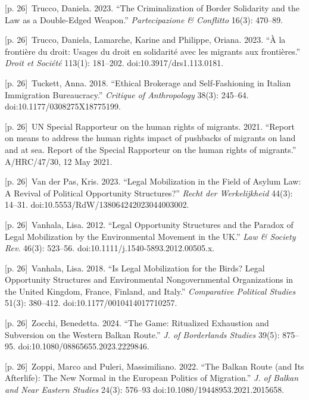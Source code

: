\documentclass[10pt,a4paper]{article}
\begin{document}
{\scriptsize\color{gray} [p. 26]}\ Trucco, Daniela. 2023. “The Criminalization of Border Solidarity and the Law as a Double-Edged Weapon.” \textit{Partecipazione \& Conflitto} 16(3): 470–89.\par
{\scriptsize\color{gray} [p. 26]}\ Trucco, Daniela, Lamarche, Karine and Philippe, Oriana. 2023. “À la frontière du droit: Usages du droit en solidarité avec les migrants aux frontières.” \textit{Droit et Société} 113(1): 181–202. doi:10.3917/drs1.113.0181.\par
{\scriptsize\color{gray} [p. 26]}\ Tuckett, Anna. 2018. “Ethical Brokerage and Self-Fashioning in Italian Immigration Bureaucracy.” \textit{Critique of Anthropology} 38(3): 245–64. doi:10.1177/0308275X18775199.\par
{\scriptsize\color{gray} [p. 26]}\ UN Special Rapporteur on the human rights of migrants. 2021. “Report on means to address the human rights impact of pushbacks of migrants on land and at sea. Report of the Special Rapporteur on the human rights of migrants.” A/HRC/47/30, 12 May 2021.\par
{\scriptsize\color{gray} [p. 26]}\ Van der Pas, Kris. 2023. “Legal Mobilization in the Field of Asylum Law: A Revival of Political Opportunity Structures?” \textit{Recht der Werkelijkheid} 44(3): 14–31. doi:10.5553/RdW/138064242023044003002.\par
{\scriptsize\color{gray} [p. 26]}\ Vanhala, Lisa. 2012. “Legal Opportunity Structures and the Paradox of Legal Mobilization by the Environmental Movement in the UK.” \textit{Law \& Society Rev}. 46(3): 523–56. doi:10.1111/j.1540-5893.2012.00505.x.\par
{\scriptsize\color{gray} [p. 26]}\ Vanhala, Lisa. 2018. “Is Legal Mobilization for the Birds? Legal Opportunity Structures and Environmental Nongovernmental Organizations in the United Kingdom, France, Finland, and Italy.” \textit{Comparative Political Studies} 51(3): 380–412. doi:10.1177/0010414017710257.\par
{\scriptsize\color{gray} [p. 26]}\ Zocchi, Benedetta. 2024. “The Game: Ritualized Exhaustion and Subversion on the Western Balkan Route.” \textit{J. of Borderlands Studies} 39(5): 875–95. doi:10.1080/08865655.2023.2229846.\par
{\scriptsize\color{gray} [p. 26]}\ Zoppi, Marco and Puleri, Massimiliano. 2022. “The Balkan Route (and Its Afterlife): The New Normal in the European Politics of Migration.” \textit{J. of Balkan and Near Eastern Studies} 24(3): 576–93 doi:10.1080/19448953.2021.2015658.\par
\end{document}
